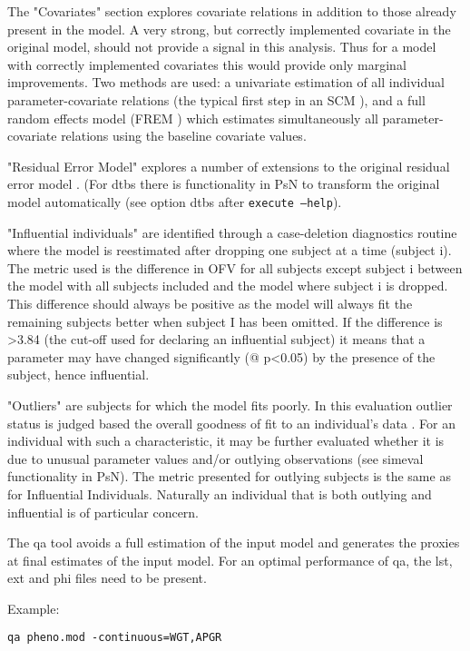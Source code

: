 The "Covariates" section explores covariate relations in addition to those already present in the model. A very strong, but correctly implemented covariate in the original model, should not provide a signal in this analysis. Thus for a model with correctly implemented covariates this would provide only marginal improvements. Two methods are used: a univariate estimation of all individual parameter-covariate relations (the typical first step in an SCM \cite{Jonsson2}), and a full random effects model (FREM \cite{Karlsson, Yun, Yngman}) which estimates simultaneously all parameter-covariate relations using the baseline covariate values.

"Residual Error Model" explores a number of extensions to the original residual error model \cite{Ibrahim, Karlsson2, Karlsson3, Dosne2012}. (For dtbs there is functionality in PsN to transform the original model automatically (see option dtbs after \verb|execute –help|). 

"Influential individuals" are identified through a case-deletion diagnostics routine where the model is reestimated after dropping one subject at a time (subject i). The metric used is the difference in OFV for all subjects except subject i between the model with all subjects included and the model where subject i is dropped. This difference should always be positive as the model will always fit the remaining subjects better when subject I has been omitted. If the difference is >3.84 (the cut-off used for declaring an influential subject) it means that a parameter may have changed significantly (@ p<0.05) by the presence of the subject, hence influential.

"Outliers" are subjects for which the model fits poorly. In this evaluation outlier status is judged based the overall goodness of fit to an individual's data \cite{Largajolli}. For an individual with such a characteristic, it may be further evaluated whether it is due to unusual parameter values and/or outlying observations (see simeval functionality in PsN). The metric presented for outlying subjects is the same as for Influential Individuals. Naturally an individual that is both outlying and influential is of particular concern.

The qa tool avoids a full estimation of the input model and generates the proxies at final estimates of the input model. For an optimal performance of qa, the lst, ext and phi files need to be present.
\newpage

Example:
\begin{verbatim}
qa pheno.mod -continuous=WGT,APGR
\end{verbatim}

